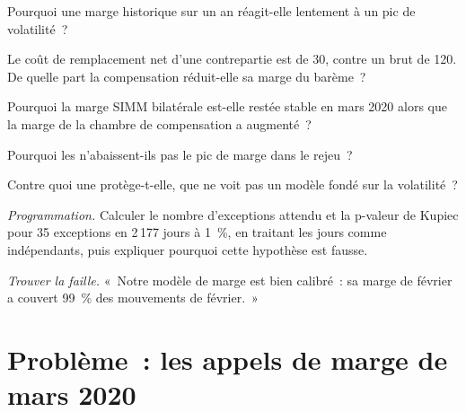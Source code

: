 \begin{exercise}[$\star$]\label{exo:rc:margin-models:2}
Pourquoi une marge historique sur un an réagit-elle lentement à un pic de volatilité~?
\end{exercise}

\begin{exercise}[$\star$]\label{exo:rc:margin-models:3}
Le coût de remplacement net d'une contrepartie est de 30, contre un brut de 120. De quelle part la compensation
réduit-elle sa marge du barème~?
\end{exercise}

\begin{exercise}[$\star\star$]\label{exo:rc:margin-models:4}
Pourquoi la marge SIMM bilatérale est-elle restée stable en mars 2020 alors que la marge de la chambre de compensation a augmenté~?
\end{exercise}

\begin{exercise}[$\star\star$]\label{exo:rc:margin-models:5}
Pourquoi les  n'abaissent-ils pas le pic de marge dans le rejeu~?
\end{exercise}

\begin{exercise}[$\star\star$]\label{exo:rc:margin-models:6}
Contre quoi une  protège-t-elle, que ne voit pas un modèle fondé sur la volatilité~?
\end{exercise}

\begin{exercise}[$\star\star\star$]\label{exo:rc:margin-models:7}
\emph{Programmation.} Calculer le nombre d'exceptions attendu et la p-valeur de Kupiec pour 35 exceptions en
2\,177 jours à 1~\%, en traitant les jours comme indépendants, puis expliquer pourquoi cette hypothèse est fausse.
\end{exercise}

\begin{exercise}[$\star\star\star$]\label{exo:rc:margin-models:8}
\emph{Trouver la faille.} «~Notre modèle de marge est bien calibré~: sa marge de février a couvert 99~\% des
mouvements de février.~»
\end{exercise}

\section{Problème~: les appels de marge de mars 2020}

